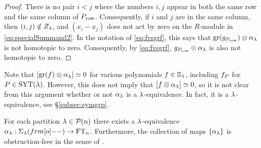 \begin{proof}
There is no pair $i < j$ where the numbers $i, j$ appear in both the same row and the same column of $P_{\operatorname{row}}$. Consequently, if $i$ and $j$ are in the same column, then $(i,j) \notin Z_\lambda$, and $(x_i - x_j)$ does not act by zero on the $R$-module in \eqref{eq:specialSummand2}.  In the notation of \eqref{eq:fvsgrf}, this says that $\operatorname{gr}(g_{P_{\operatorname{row}}}) \otimes \alpha_\lambda$ is not homotopic to zero.  Consequently, by \eqref{eq:fvsgrf}, $g_{P_{\operatorname{row}}} \otimes \alpha_\lambda$ is also not homotopic to zero.
%
\end{proof}

\begin{remark} Note that $[\operatorname{gr}(f) \otimes \alpha_\lambda] \simeq 0$ for various polynomials $f \in {\mathbb{S}}_\lambda$, including $f_{P}$ for $P \in \operatorname{SYT}(\lambda)$. However, this does not imply that $[f \otimes \alpha_\lambda] \simeq 0$, so it is not clear from this argument whether or not $\alpha_\lambda$ is a $\lambda$-equivalence.  In fact, it is a $\lambda$-equivalence, see \S\ref{subsec:symgrp}.\end{remark}


\begin{theorem}\label{thm:lambdaMaps}
For each partition $\lambda \in {\mathcal{P}}(n)$ there exists a $\lambda$-equivalence $\a_\l: \shift{\l}{\one}\to \FT_n$. Furthermore, the collection of maps $\{\alpha_\lambda\}$ is obstruction-free in the sense of \cite{ElHog17a}. 
\end{theorem}

